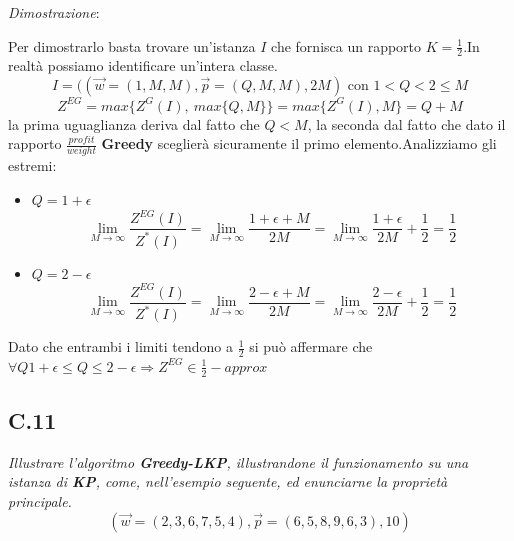 \documentclass[a4paper]{article}
\newenvironment{dimostrazione}{\textit{Dimostrazione}:\begin{adjustwidth}{1cm}{}}{\end{adjustwidth}}
\begin{document}
\begin{dimostrazione}
	Per dimostrarlo basta trovare un'istanza $I$ che fornisca un rapporto $K=\frac{1}{2}$.In realtà possiamo identificare un'intera classe.
	$$I= ((\vec w = (1,M,M), \vec p = (Q,M,M),2M) \text{ con } 1<Q<2 \leq M$$
	$$ Z^{EG}= max\{Z^G(I),\: max\{Q,M\}\} = max\{Z^G(I),M\} = Q+M$$
	la prima uguaglianza deriva dal fatto che $Q < M$, la seconda dal fatto che dato il rapporto $\frac{profit}{weight}$ \textbf{Greedy} sceglierà sicuramente il primo elemento.Analizziamo gli estremi:
	\begin{itemize}
		\item $Q= 1 + \epsilon$
			$$\lim_{M \to \infty} \frac{Z^{EG}(I)}{Z^*(I)} =  \lim_{M \to \infty}\frac{1+\epsilon + M}{2M} =\lim_{M \to \infty}\frac{1+\epsilon}{2M} + \frac{1}{2} = \frac{1}{2}$$
		\item $Q= 2 - \epsilon$
			$$\lim_{M \to \infty} \frac{Z^{EG}(I)}{Z^*(I)} =  \lim_{M \to \infty}\frac{2-\epsilon + M}{2M} =\lim_{M \to \infty}\frac{2-\epsilon}{2M} + \frac{1}{2} = \frac{1}{2}$$
	\end{itemize}
	Dato che entrambi i limiti tendono a $\frac{1}{2}$ si può affermare che $ \forall Q 1+\epsilon \leq Q \leq 2- \epsilon \Rightarrow Z^{EG} \in \frac{1}{2}-approx$
\end{dimostrazione}
\subsection{C.11}
\emph{Illustrare l'algoritmo \textbf{Greedy-LKP}, illustrandone il funzionamento su una istanza di \textbf{KP}, come, nell'esempio seguente, ed enunciarne la proprietà principale.}
$$(\vec w = (2, 3, 6, 7, 5, 4), \vec p = (6, 5, 8, 9, 6, 3), 10)$$
\end{document}
